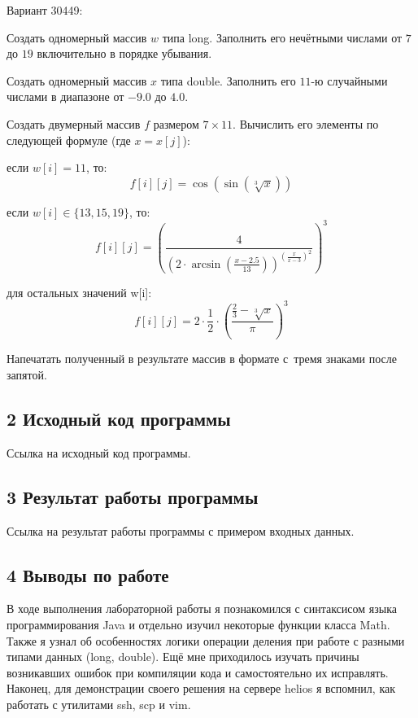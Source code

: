\newpage
{\ital Вариант 30449:}
\begin{list*}[][\#]
\item Создать одномерный массив $w$ типа long. Заполнить его нечётными числами от $7$ до $19$ включительно в порядке убывания.
\item Создать одномерный массив $x$ типа double. Заполнить его $11$-ю случайными числами в диапазоне от $-9.0$ до $4.0$.
\item Создать двумерный массив $f$ размером $7\times 11$. Вычислить его элементы по следующей формуле {\ital (где $x=x[j]$)}:
\begin{list*}[2]
\item если $w[i] = 11$, то:
$$f[i][j]=\cos(\sin(\sqrt[3]{x}))$$
\item если $w[i]\in\{13,15,19\}$, то:
$$f[i][j]=\left(\frac{4}{\left(2\cdot\arcsin\left(\frac{x-2.5}{13}\right)\right)^{\left(\frac{x}{x-3}\right)^2}}\right)^3$$
\item для остальных значений w[i]:
$$f[i][j]=2\cdot\frac{1}{2}\cdot\left(\frac{\frac{2}{3}-\sqrt[3]{x}}{\pi}\right)^3$$
\end{list*}
\item Напечатать полученный в результате массив в формате с~тремя знаками после запятой.
\end{list*}

\subsection{2 Исходный код программы}

Ссылка на исходный код программы.

\subsection{3 Результат работы программы}

Ссылка на результат работы программы с примером входных данных.

\newpage
\subsection{4 Выводы по работе}

В ходе выполнения лабораторной работы я познакомился с синтаксисом языка программирования Java и отдельно изучил некоторые функции класса Math. Также я узнал об особенностях логики операции деления при работе с разными типами данных {\ital (long, double)}. Ещё мне приходилось изучать причины возникавших ошибок при компиляции кода и самостоятельно их исправлять. Наконец, для демонстрации своего решения на сервере helios я вспомнил, как работать с утилитами {\ital ssh}, {\ital scp} и {\ital vim}.


